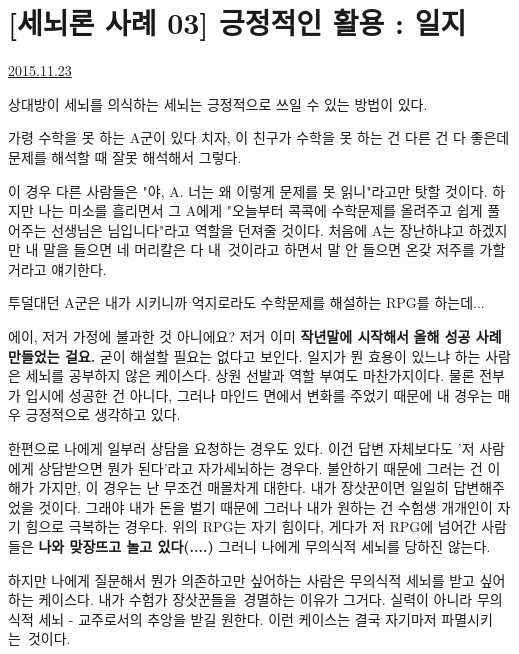 \section{[세뇌론 사례 03] 긍정적인 활용 : 일지}
\href{https://www.kockoc.com/Apoc/505768}{2015.11.23}

\vspace{5mm}

상대방이 세뇌를 의식하는 세뇌는 긍정적으로 쓰일 수 있는 방법이 있다.
\vspace{5mm}

가령 수학을 못 하는 A군이 있다 치자,
이 친구가 수학을 못 하는 건 다른 건 다 좋은데 문제를 해석할 때 잘못 해석해서 그렇다.
\vspace{5mm}

이 경우 다른 사람들은 "야, A. 너는 왜 이렇게 문제를 못 읽니"라고만 탓할 것이다.
하지만 나는 미소를 흘리면서 그 A에게 "오늘부터 콕콕에 수학문제를 올려주고 쉽게 풀어주는 선생님은 님입니다"라고 역할을 던져줄 것이다.
처음에 A는 장난하냐고 하겠지만 내 말을 들으면 네 머리칼은 다 내 것이라고 하면서 말 안 들으면 온갖 저주를 가할 거라고 얘기한다.
\vspace{5mm}

투덜대던 A군은 내가 시키니까 억지로라도 수학문제를 해설하는 RPG를 하는데...
\vspace{5mm}

에이, 저거 가정에 불과한 것 아니에요?
저거 이미 \textbf{작년말에 시작해서} \textbf{올해 성공 사례 만들었는 걸요.}
굳이 해설할 필요는 없다고 보인다.
일지가 뭔 효용이 있느냐 하는 사람은 세뇌를 공부하지 않은 케이스다.
상원 선발과 역할 부여도 마찬가지이다.
물론 전부가 입시에 성공한 건 아니다, 그러나 마인드 면에서 변화를 주었기 때문에 내 경우는 매우 긍정적으로 생각하고 있다.
\vspace{5mm}

한편으로 나에게 일부러 상담을 요청하는 경우도 있다.
이건 답변 자체보다도 '저 사람에게 상담받으면 뭔가 된다'라고 자가세뇌하는 경우다.
불안하기 때문에 그러는 건 이해가 가지만, 이 경우는 난 무조건 매몰차게 대한다.
내가 장삿꾼이면 일일히 답변해주었을 것이다. 그래야 내가 돈을 벌기 때문에
그러나 내가 원하는 건 수험생 개개인이 자기 힘으로 극복하는 경우다.
위의 RPG는 자기 힘이다, 게다가 저 RPG에 넘어간 사람들은 \textbf{나와 맞장뜨고 놀고 있다(....)}
그러니 나에게 무의식적 세뇌를 당하진 않는다.
\vspace{5mm}

하지만 나에게 질문해서 뭔가 의존하고만 싶어하는 사람은 무의식적 세뇌를 받고 싶어하는 케이스다.
내가 수험가 장삿꾼들을 경멸하는 이유가 그거다. 실력이 아니라 무의식적 세뇌 - 교주로서의 추앙을 받길 원한다.
이런 케이스는 결국 자기마저 파멸시키는 것이다.
\vspace{5mm}

